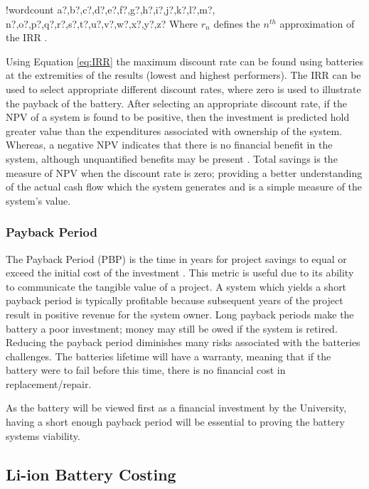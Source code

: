 \documentclass[fontsize=9.5pt]{extarticle}
\numberwithin{figure}{section} %
\newcounter{words}
\newenvironment{counted}{%
  \setcounter{words}{0}
  \SearchList!{wordcount}{\stepcounter{words}}
    {a?,b?,c?,d?,e?,f?,g?,h?,i?,j?,k?,l?,m?,
    n?,o?,p?,q?,r?,s?,t?,u?,v?,w?,x?,y?,z?}
  \UndoBoundary{'}
  \SearchOrder{p;}}{%
  \StopSearching}
\begin{document}
\begin{counted}
Where \(r_{ n }\) defines the \(n^{th}\) approximation of the IRR
\cite{xxxdvi44:online}.

Using Equation \ref{eq:IRR} the maximum discount rate can be found using
batteries at the extremities of the results (lowest and highest
performers). The IRR can be used to select appropriate different
discount rates, where zero is used to illustrate the payback of the
battery. After selecting an appropriate discount rate, if the NPV of a
system is found to be positive, then the investment is predicted hold
greater value than the expenditures associated with ownership of the
system. Whereas, a negative NPV indicates that there is no financial
benefit in the system, although unquantified benefits may be present
\cite{diorio2015economic}. Total savings is the measure of NPV when the
discount rate is zero; providing a better understanding of the actual
cash flow which the system generates and is a simple measure of the
system's value.

\subsubsection{Payback Period}\label{payback-period}

The Payback Period (PBP) is the time in years for project savings to
equal or exceed the initial cost of the investment
\cite{diorio2015economic}. This metric is useful due to its ability to
communicate the tangible value of a project. A system which yields a
short payback period is typically profitable because subsequent years of
the project result in positive revenue for the system owner. Long
payback periods make the battery a poor investment; money may still be
owed if the system is retired. Reducing the payback period diminishes
many risks associated with the batteries challenges. The batteries
lifetime will have a warranty, meaning that if the battery were to fail
before this time, there is no financial cost in replacement/repair.

As the battery will be viewed first as a financial investment by the
University, having a short enough payback period will be essential to
proving the battery systems viability.

\subsection{Li-ion Battery Costing}\label{li-ion-battery-costing}


\end{counted}
\end{document}
